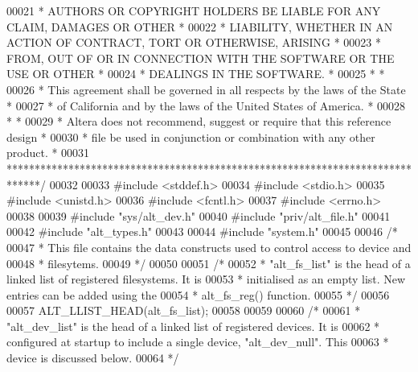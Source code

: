 \begin{DoxyCode}
00021 \textcolor{comment}{* AUTHORS OR COPYRIGHT HOLDERS BE LIABLE FOR ANY CLAIM, DAMAGES OR OTHER      *}
00022 \textcolor{comment}{* LIABILITY, WHETHER IN AN ACTION OF CONTRACT, TORT OR OTHERWISE, ARISING     *}
00023 \textcolor{comment}{* FROM, OUT OF OR IN CONNECTION WITH THE SOFTWARE OR THE USE OR OTHER         *}
00024 \textcolor{comment}{* DEALINGS IN THE SOFTWARE.                                                   *}
00025 \textcolor{comment}{*                                                                             *}
00026 \textcolor{comment}{* This agreement shall be governed in all respects by the laws of the State   *}
00027 \textcolor{comment}{* of California and by the laws of the United States of America.              *}
00028 \textcolor{comment}{*                                                                             *}
00029 \textcolor{comment}{* Altera does not recommend, suggest or require that this reference design    *}
00030 \textcolor{comment}{* file be used in conjunction or combination with any other product.          *}
00031 \textcolor{comment}{******************************************************************************/}
00032 
00033 \textcolor{preprocessor}{#include <stddef.h>}
00034 \textcolor{preprocessor}{#include <stdio.h>}
00035 \textcolor{preprocessor}{#include <unistd.h>}
00036 \textcolor{preprocessor}{#include <fcntl.h>}
00037 \textcolor{preprocessor}{#include <errno.h>}
00038 
00039 \textcolor{preprocessor}{#include "sys/alt_dev.h"}
00040 \textcolor{preprocessor}{#include "priv/alt_file.h"}
00041 
00042 \textcolor{preprocessor}{#include "alt_types.h"}
00043 
00044 \textcolor{preprocessor}{#include "system.h"}
00045 
00046 \textcolor{comment}{/*}
00047 \textcolor{comment}{ * This file contains the data constructs used to control access to device and}
00048 \textcolor{comment}{ * filesytems.}
00049 \textcolor{comment}{ */}
00050 
00051 \textcolor{comment}{/*}
00052 \textcolor{comment}{ * "alt\_fs\_list" is the head of a linked list of registered filesystems. It is }
00053 \textcolor{comment}{ * initialised as an empty list. New entries can be added using the }
00054 \textcolor{comment}{ * alt\_fs\_reg() function.  }
00055 \textcolor{comment}{ */}
00056 
00057 ALT_LLIST_HEAD(alt_fs_list);
00058 
00059 
00060 \textcolor{comment}{/*}
00061 \textcolor{comment}{ * "alt\_dev\_list" is the head of a linked list of registered devices. It is}
00062 \textcolor{comment}{ * configured at startup to include a single device, "alt\_dev\_null". This}
00063 \textcolor{comment}{ * device is discussed below.}
00064 \textcolor{comment}{ */}

\end{DoxyCode}
